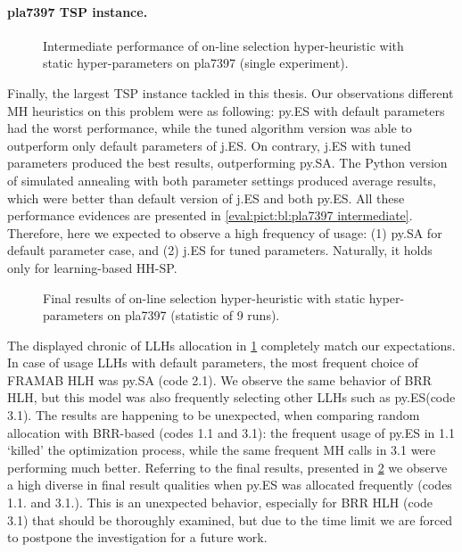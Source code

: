 \paragraph{pla7397 TSP instance.}
\begin{figure}[t]
	\centering
	\vspace{-20pt}
	
	\caption{Intermediate performance of on-line selection hyper-heuristic with static hyper-parameters on pla7397 (single experiment).}
	\vspace{-10pt}
	\label{eval:pict:hh-sp:pla7397 intermediate}
\end{figure}
Finally, the largest TSP instance tackled in this thesis. Our observations different MH heuristics on this problem were as following: py.ES with default parameters had the worst performance, while the tuned algorithm version was able to outperform only default parameters of j.ES. On contrary, j.ES with tuned parameters produced the best results, outperforming py.SA. The Python version of simulated annealing with both parameter settings produced average results, which were better than default version of j.ES and both py.ES. All these performance evidences are presented in \cref{eval:pict:bl:pla7397 intermediate}. Therefore, here we expected to observe a high frequency of usage: (1) py.SA for default parameter case, and (2) j.ES for tuned parameters. Naturally, it holds only for learning-based HH-SP.


\begin{figure}[b]
	\centering
	\vspace{-20pt}
	
	\caption{Final results of on-line selection hyper-heuristic with static hyper-parameters on pla7397 (statistic of 9 runs).}
	\vspace{-5pt}
	\label{eval:pict:hh-sp:pla7397 final}
\end{figure}

The displayed chronic of LLHs allocation in \cref{eval:pict:hh-sp:pla7397 intermediate} completely match our expectations. In case of usage LLHs with default parameters, the most frequent choice of FRAMAB HLH was py.SA (code 2.1). We observe the same behavior of BRR HLH, but this model was also frequently selecting other LLHs such as py.ES(code 3.1). The results are happening to be unexpected, when comparing random allocation with BRR-based (codes 1.1 and 3.1): the frequent usage of py.ES in 1.1 `killed' the optimization process, while the same frequent MH calls in 3.1 were performing much better. Referring to the final results, presented in \cref{eval:pict:hh-sp:pla7397 final} we observe a high diverse in final result qualities when py.ES was allocated frequently (codes 1.1. and 3.1.). This is an unexpected behavior, especially for BRR HLH (code 3.1) that should be thoroughly examined, but due to the time limit we are forced to postpone the investigation for a future work.

